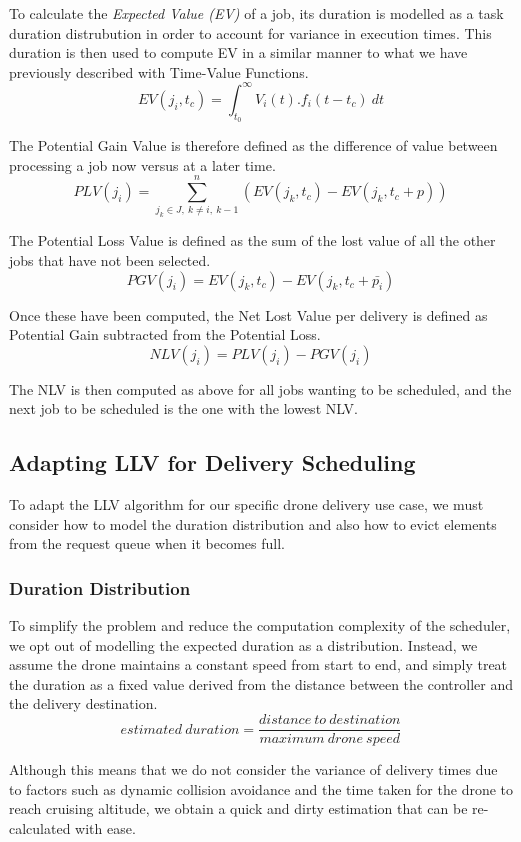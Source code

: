 \documentclass[a4paper,11pt,titlepage]{report}
\begin{document}
To calculate the \textit{Expected Value (EV)} of a job, its duration is modelled as a task duration distrubution in order to account for variance in execution times. This duration is then used to compute EV in a similar manner to what we have previously described with Time-Value Functions.
$$ EV(j_{i}, t_{c}) = \int_{t_{0}}^{\infty} V_{i}(t).f_{i}(t-t_{c})\ dt $$

\clearpage
The Potential Gain Value is therefore defined as the difference of value between processing a job now versus at a later time.
$$ PLV(j_{i}) = \sum_{j_{k}\in J,\ k\neq i,\ k-1}^{n} (EV(j_{k},t_{c}) - EV(j_{k}, t_{c}+p)) $$

The Potential Loss Value is defined as the sum of the lost value of all the other jobs that have not been selected.
$$ PGV(j_{i}) = EV(j_{k},t_{c}) - EV(j_{k}, t_{c}+\bar{p_{i}}) $$

Once these have been computed, the Net Lost Value per delivery is defined as Potential Gain subtracted from the Potential Loss.
$$ NLV(j_{i}) = PLV(j_{i}) - PGV(j_{i}) $$

The NLV is then computed as above for all jobs wanting to be scheduled, and the next job to be scheduled is the one with the lowest NLV.

\subsection{Adapting LLV for Delivery Scheduling}
To adapt the LLV algorithm for our specific drone delivery use case, we must consider how to model the duration distribution and also how to evict elements from the request queue when it becomes full.

\subsubsection{Duration Distribution}
To simplify the problem and reduce the computation complexity of the scheduler, we opt out of modelling the expected duration as a distribution. Instead, we assume the drone maintains a constant speed from start to end, and simply treat the duration as a fixed value derived from the distance between the controller and the delivery destination.
$$ estimated\ duration = \frac{distance\ to\ destination}{maximum\ drone\ speed} $$

Although this means that we do not consider the variance of delivery times due to factors such as dynamic collision avoidance and the time taken for the drone to reach cruising altitude, we obtain a quick and dirty estimation that can be re-calculated with ease.\\
\end{document}
